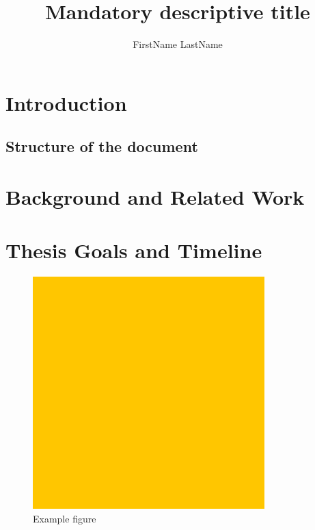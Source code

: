 \documentclass{si-msc-proposal}
\author{FirstName LastName}
\title{Mandatory descriptive title}
\begin{document}
\maketitle

\thispagestyle{empty}
\tableofcontents
\listoffigures
\clearpage
{}


\section{Introduction}

\subsection{Structure of the document}

\section{Background and Related Work}\label{sec:bg-rw}

\section{Thesis Goals and Timeline}\label{sec:tg}

\begin{figure}[ht]
\centering
\includegraphics[width=0.8\textwidth]{example.png}
\caption{Example figure}
\label{fig:example}
\end{figure}
\end{document}
